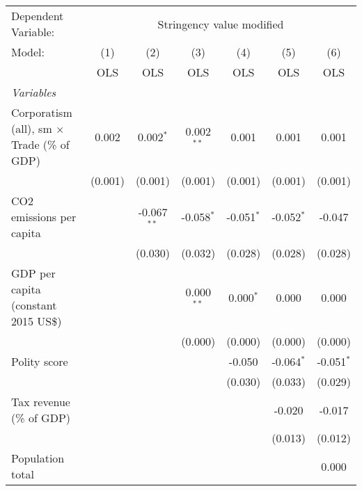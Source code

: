 
\begingroup
\centering
\begin{tabular}{lcccccc}
   \toprule
   Dependent Variable: & \multicolumn{6}{c}{Stringency value modified}\\
   Model:                                             & (1)     & (2)           & (3)          & (4)          & (5)          & (6)\\  
                                                      &  OLS    & OLS           & OLS          & OLS          & OLS          & OLS\\  
   \midrule
   \emph{Variables}\\
   Corporatism (all), sm $\times$ Trade (\% of GDP)   & 0.002   & 0.002$^{*}$   & 0.002$^{**}$ & 0.001        & 0.001        & 0.001\\   
                                                      & (0.001) & (0.001)       & (0.001)      & (0.001)      & (0.001)      & (0.001)\\   
   CO2 emissions per capita                           &         & -0.067$^{**}$ & -0.058$^{*}$ & -0.051$^{*}$ & -0.052$^{*}$ & -0.047\\   
                                                      &         & (0.030)       & (0.032)      & (0.028)      & (0.028)      & (0.028)\\   
   GDP per capita (constant 2015 US\$)                &         &               & 0.000$^{**}$ & 0.000$^{*}$  & 0.000        & 0.000\\   
                                                      &         &               & (0.000)      & (0.000)      & (0.000)      & (0.000)\\   
   Polity score                                       &         &               &              & -0.050       & -0.064$^{*}$ & -0.051$^{*}$\\   
                                                      &         &               &              & (0.030)      & (0.033)      & (0.029)\\   
   Tax revenue (\% of GDP)                            &         &               &              &              & -0.020       & -0.017\\   
                                                      &         &               &              &              & (0.013)      & (0.012)\\   
   Population total                                   &         &               &              &              &              & 0.000\\   

\end{tabular}
